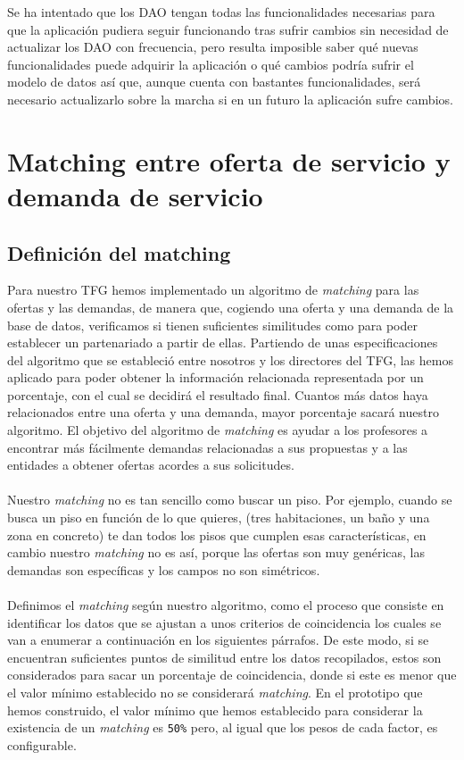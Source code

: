 \documentclass[11pt]{book}
\begin{document}
	Se ha intentado que los DAO tengan todas las funcionalidades necesarias para que la aplicación pudiera seguir funcionando tras sufrir cambios sin necesidad de actualizar los DAO con frecuencia, pero resulta imposible saber qué nuevas funcionalidades puede adquirir la aplicación o qué cambios podría sufrir el modelo de datos así que, aunque cuenta con bastantes funcionalidades, será necesario actualizarlo sobre la marcha si en un futuro la aplicación sufre cambios.
	
	\chapter{Matching entre oferta de servicio y demanda de servicio}\label{cap:matching}
	
	\section{Definición del matching }
	
	Para nuestro TFG hemos implementado un algoritmo de \emph{matching} para las ofertas y las demandas, de manera que, cogiendo una oferta y una demanda de la base de datos, verificamos si tienen suficientes similitudes como para poder establecer un partenariado a partir de ellas. Partiendo de unas especificaciones del algoritmo que se estableció entre nosotros y los directores del TFG, las hemos aplicado para poder obtener la información relacionada representada por un porcentaje, con el cual se decidirá el resultado final.  Cuantos más datos haya relacionados entre una oferta y una demanda, mayor porcentaje sacará nuestro algoritmo. El objetivo del algoritmo de \emph{matching} es ayudar a los profesores a encontrar más fácilmente demandas relacionadas a sus propuestas y a las entidades a obtener ofertas acordes a sus solicitudes. \\\\
	Nuestro \emph{matching} no es tan sencillo como buscar un piso. Por ejemplo, cuando se busca un piso en función de lo que quieres, (tres habitaciones, un baño y una zona en concreto) te dan todos los pisos que cumplen esas características, en cambio nuestro \emph{matching} no es así, porque las ofertas son muy genéricas, las demandas son específicas y los campos no son simétricos.\\\\
	Definimos el \emph{matching} según nuestro algoritmo, como el proceso que consiste en identificar los datos que se ajustan a unos criterios de coincidencia los cuales se van a enumerar a continuación en los siguientes párrafos. De este modo, si se encuentran suficientes puntos de similitud entre los datos recopilados, estos son considerados para sacar un porcentaje de coincidencia, donde si este es menor que el valor mínimo establecido no se considerará \emph{matching}. En el prototipo que hemos construido, el valor mínimo que hemos
	establecido para considerar la existencia de un \emph{matching} es \texttt{50\%} pero, al
	igual que los pesos de cada factor, es configurable.
	\\\\
	
\end{document}
